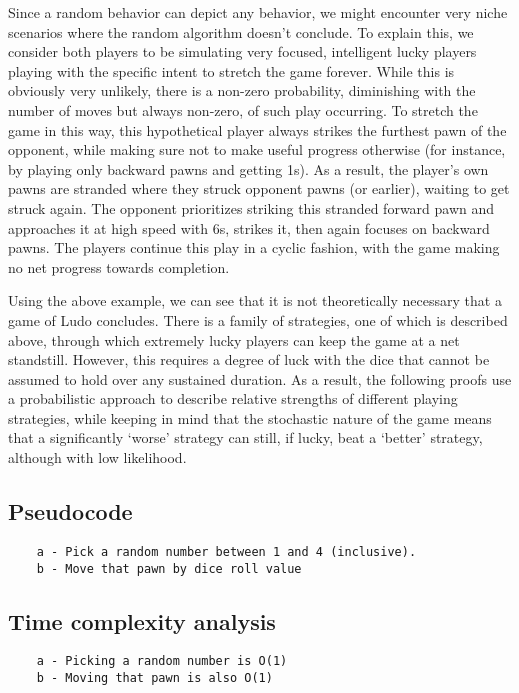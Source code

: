 \documentclass{article} %
\begin{document}
Since a random behavior can depict any behavior, we might encounter very niche scenarios where the random algorithm doesn’t conclude. To explain this, we consider both players to be simulating very focused, intelligent lucky players playing with the specific intent to stretch the game forever. While this is obviously very unlikely, there is a non-zero probability, diminishing with the number of moves but always non-zero, of such play occurring. To stretch the game in this way, this hypothetical player always strikes the furthest pawn of the opponent, while making sure not to make useful progress otherwise (for instance, by playing only backward pawns and getting 1s). As a result, the player’s own pawns are stranded where they struck opponent pawns (or earlier), waiting to get struck again. The opponent prioritizes striking this stranded forward pawn and approaches it at high speed with 6s, strikes it, then again focuses on backward pawns. The players continue this play in a cyclic fashion, with the game making no net progress towards completion. 

Using the above example, we can see that it is not theoretically necessary that a game of Ludo concludes. There is a family of strategies, one of which is described above, through which extremely lucky players can keep the game at a net standstill. However, this requires a degree of luck with the dice that cannot be assumed to hold over any sustained duration. As a result, the following proofs use a probabilistic approach to describe relative strengths of different playing strategies, while keeping in mind that the stochastic nature of the game means that a significantly ‘worse’ strategy can still, if lucky, beat a ‘better’ strategy, although with low likelihood.

\subsection{Pseudocode} 
\begin{verbatim}
    a - Pick a random number between 1 and 4 (inclusive).
    b - Move that pawn by dice roll value
\end{verbatim}

\subsection{Time complexity analysis}

\begin{verbatim}
    a - Picking a random number is O(1)
    b - Moving that pawn is also O(1) 
\end{verbatim}
\end{document}
